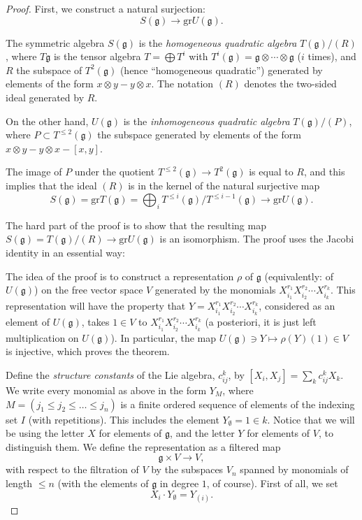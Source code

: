 \begin{proof}
First, we construct a natural surjection:
$$ S(\mathfrak g)\to \text{gr} U(\mathfrak g).$$

The symmetric algebra $S(\mathfrak g)$ is the \emph{homogeneous quadratic algebra} $T(\mathfrak g)/(R)$, where $T\mathfrak g$ is the tensor algebra $T = \bigoplus T^i$ with $T^i(\mathfrak g) = \mathfrak g \otimes \cdots \otimes \mathfrak g$ ($i$ times), and $R$ the subspace of $T^2(\mathfrak g)$ (hence ``homogeneous quadratic'') generated by elements of the form $x\otimes y - y\otimes x$. The notation $(R)$ denotes the two-sided ideal generated by $R$.

On the other hand, $U(\mathfrak g)$ is the \emph{inhomogeneous quadratic algebra} $T(\mathfrak g)/(P)$, where $P\subset T^{\le 2}(\mathfrak g)$ the subspace generated by elements of the form $x\otimes y - y\otimes x -[x,y]$. 

The image of $P$ under the quotient $T^{\le 2}(\mathfrak g) \to T^2(\mathfrak g)$ is equal to $R$, and this implies that the ideal $(R)$ is in the kernel of the natural surjective map 
$$S(\mathfrak g) =\text{gr} T(\mathfrak g) = \bigoplus_i T^{\le i}(\mathfrak g)/T^{\le i-1}(\mathfrak g) \to \text{gr} U(\mathfrak g).$$ 

The hard part of the proof is to show that the resulting map $S(\mathfrak g) = T(\mathfrak g)/(R) \to \text{gr} U(\mathfrak g)$ is an isomorphism. The proof uses the Jacobi identity in an essential way:

The idea of the proof is to construct a representation $\rho$ of $\mathfrak g$ (equivalently: of $U(\mathfrak g)$) on the free vector space $V$ generated by the monomials $X_{i_1}^{r_1}X_{i_2}^{r_2}\cdots X_{i_k}^{r_k}$. This representation will have the property that $Y=X_{i_1}^{r_1}X_{i_2}^{r_2}\cdots X_{i_k}^{r_k}$, considered as an element of $U(\mathfrak g)$, takes $1 \in V$ to $X_{i_1}^{r_1}X_{i_2}^{r_2}\cdots X_{i_k}^{r_k}$ (a posteriori, it is just left multiplication on $U(\mathfrak g)$). In particular, the map $U(\mathfrak g)\ni Y \mapsto \rho(Y)(1)\in  V$ is injective, which proves the theorem.

Define the {\it structure constants} of the Lie algebra, $c_{ij}^k$, by $[X_i,X_j]=\sum_k c_{ij}^k X_k$.
We write every monomial as above in the form $Y_M$, where $M = (j_1 \le j_2 \le\dots \le j_n)$ is a finite ordered sequence of elements of the indexing set $I$ (with repetitions). This includes the element $Y_\emptyset = 1\in k$. Notice that we will be using the letter $X$ for elements of $\mathfrak g$, and the letter $Y$ for elements of $V$, to distinguish them. We define the representation as a filtered map 
$$ \mathfrak g \times V\to  V,$$ 
with respect to the filtration of $V$ by the subspaces $V_n$ spanned by monomials of length $\le n$ (with the elements of $\mathfrak g$ in degree $1$, of course). First of all, we set 
$$X_i \cdot Y_\emptyset = Y_{(i)}.$$


\end{proof}
